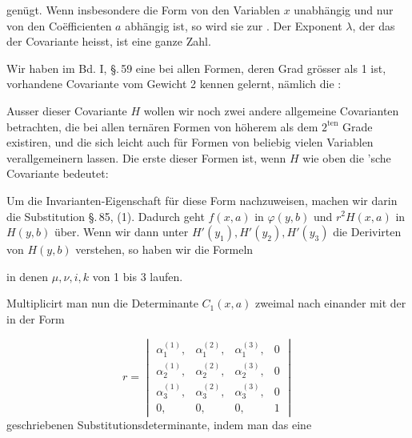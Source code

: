 genügt. Wenn insbesondere die Form von den Variablen $x$ unabhängig und nur von den Coëfficienten $a$ abhängig ist, so wird sie zur . Der Exponent $\lambda$, der das  der Covariante heisst, ist eine ganze Zahl.

Wir haben im Bd. I, \S.\,59 eine bei allen Formen, deren Grad grösser als 1 ist, vorhandene Covariante vom Gewicht 2 kennen gelernt, nämlich die :


Ausser dieser Covariante $H$ wollen wir noch zwei andere allgemeine Covarianten betrachten, die bei allen ternären Formen von höherem als dem $2^{\text{ten}}$ Grade existiren, und die sich leicht auch für Formen von beliebig vielen Variablen verallgemeinern lassen. Die erste dieser Formen ist, wenn $H$ wie oben die 'sche Covariante bedeutet:


Um die Invarianten-Eigenschaft für diese Form nachzuweisen, machen wir darin die Substitution \S.\,85, (1). Dadurch geht $f(x, a)$ in $\varphi(y, b)$ und $r^2 H(x, a)$ in $H(y, b)$ über. Wenn wir dann unter $H'(y_1), H'(y_2), H'(y_3)$ die Derivirten von $H(y, b)$ verstehen, so haben wir die Formeln

in denen $\mu, \nu, i, k$ von 1 bis 3 laufen.

Multiplicirt man nun die Determinante $C_1(x, a)$ zweimal nach einander mit der in der Form

\[
r = \begin{vmatrix} \alpha_1^{(1)}, & \alpha_1^{(2)}, & \alpha_1^{(3)}, & 0 \\ \alpha_2^{(1)}, & \alpha_2^{(2)}, & \alpha_2^{(3)}, & 0 \\ \alpha_3^{(1)}, & \alpha_3^{(2)}, & \alpha_3^{(3)}, & 0 \\ 0, & 0, & 0, & 1 \end{vmatrix}
\]
geschriebenen Substitutionsdeterminante, indem man das eine
